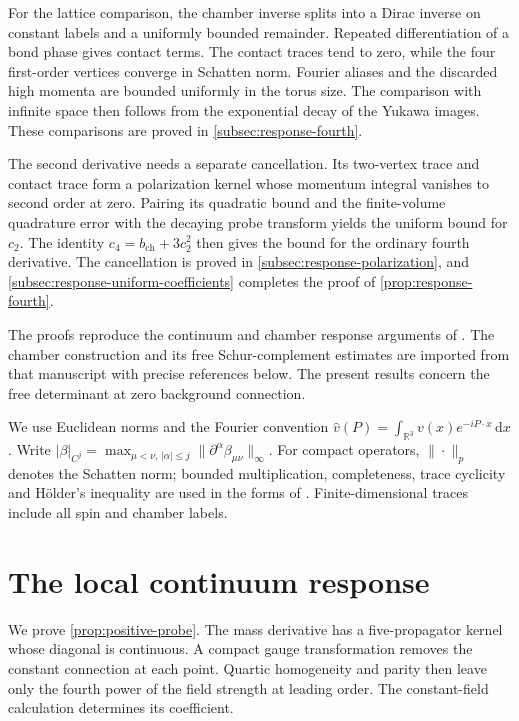 \documentclass[11pt,letterpaper,reqno]{amsart}
\newcommand{\R}{\mathbb R}
\newcommand{\dd}{\mathrm d}
\begin{document}
For the lattice comparison, the chamber inverse splits into a
Dirac inverse on constant labels and a uniformly bounded remainder.
Repeated differentiation of a bond phase gives contact terms.
The contact traces tend to zero, while the four first-order
vertices converge in Schatten norm. Fourier aliases and the
discarded high momenta are bounded uniformly in the torus size.
The comparison with infinite space then follows from the
exponential decay of the Yukawa images. These comparisons are
proved in \cref{subsec:response-fourth}.

The second derivative needs a separate cancellation. Its
two-vertex trace and contact trace form a polarization kernel whose
momentum integral vanishes to second order at zero. Pairing its
quadratic bound and the finite-volume quadrature error with the
decaying probe transform yields the uniform bound for $c_2$.
The identity $c_4=b_{\mathrm{ch}}+3c_2^2$ then gives the bound
for the ordinary fourth derivative. The cancellation is proved in
\cref{subsec:response-polarization}, and
\cref{subsec:response-uniform-coefficients} completes the proof of
\cref{prop:response-fourth}.

The proofs reproduce the continuum and chamber response arguments
of \cite[\S17--18]{QED3Master}. The chamber construction and its
free Schur-complement estimates are imported from that manuscript
with precise references below. The present results concern the
free determinant at zero background connection.

We use Euclidean norms and the Fourier convention
$\widehat v(P)=\int_{\R^3}v(x)e^{-iP\cdot x}\,\dd x$.
Write
$|\beta|_{C^j}=\max_{\mu<\nu,\,|\alpha|\le j}
\|\partial^\alpha\beta_{\mu\nu}\|_\infty$.
For compact operators, $\|\cdot\|_p$ denotes the Schatten norm;
bounded multiplication, completeness, trace cyclicity and
H\"older's inequality are used in the forms of
\cite[slides~16, 53--56]{PongeSchatten2025}.
Finite-dimensional traces include all spin and chamber labels.
\section{The local continuum response}\label{sec:positive-probe}

We prove \cref{prop:positive-probe}. The mass derivative has a
five-propagator kernel whose diagonal is continuous. A compact gauge
transformation removes the constant connection at each point.
Quartic homogeneity and parity then leave only the fourth power of
the field strength at leading order. The constant-field calculation
determines its coefficient.
\end{document}
